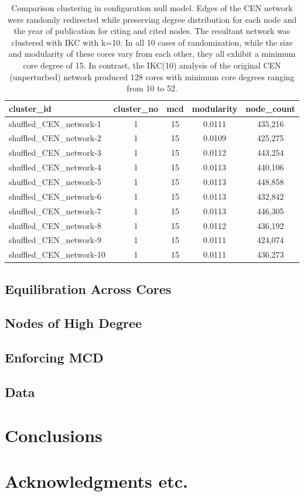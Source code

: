 \documentclass[11pt, oneside]{article}   	%
\begin{document}
\clearpage
\begin{table}[ht]
\centering
\begin{tabular}{lcccc}
  \hline
cluster\_id & cluster\_no & mcd & modularity & node\_count  \\ 
  \hline
shuffled\_CEN\_network-1 &     1 &    15 & 0.0111 & 435,216 \\
shuffled\_CEN\_network-2 &     1 &    15 & 0.0109 & 425,275 \\
shuffled\_CEN\_network-3 &     1 &    15 & 0.0112 & 443,254 \\
shuffled\_CEN\_network-4 &     1 &    15 & 0.0113 & 440,106 \\
shuffled\_CEN\_network-5 &     1 &    15 & 0.0113 & 448,858 \\
shuffled\_CEN\_network-6 &     1 &    15 & 0.0113 & 432,842 \\
shuffled\_CEN\_network-7 &     1 &    15 & 0.0113 & 446,305 \\
shuffled\_CEN\_network-8 &     1 &    15 & 0.0112 & 436,192 \\
shuffled\_CEN\_network-9 &     1 &    15 & 0.0111 & 424,074 \\
shuffled\_CEN\_network-10 &    1 &   15 & 0.0111 & 436,273 \\ 
   \hline
\end{tabular}
\caption{Comparison clustering in configuration null model. Edges of the CEN network were randomly redirected while preserving degree distribution for each node and the year of publication for citing and cited nodes. 
The resultant network was clustered with IKC with k=10.  In all 10 cases of randomization, while the size and modularity of these cores vary from each other, they all exhibit a minimum core degree of 15.
In contrast, the IKC(10) analysis of the original CEN (unperturbed) network produced 128 cores  with minimum core degrees ranging from 10 to 52. 
}
\label{tab:tab3}
\end{table}







\subsection{Equilibration Across Cores}

\subsection{Nodes of High Degree}

\subsection{Enforcing MCD}

\subsection{Data}

\section{Conclusions}
\section{Acknowledgments etc.}



\end{document}

